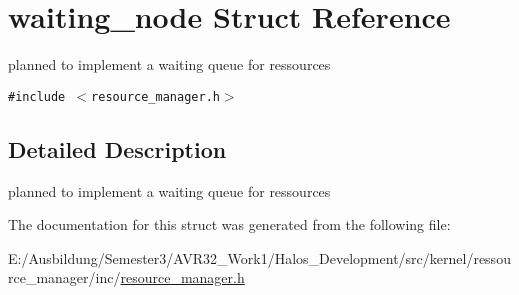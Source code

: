 \hypertarget{structwaiting__node}{
\section{waiting\_\-node Struct Reference}
\label{structwaiting__node}
}
planned to implement a waiting queue for ressources  


{\tt \#include $<$resource\_\-manager.h$>$}



\subsection{Detailed Description}
planned to implement a waiting queue for ressources 

The documentation for this struct was generated from the following file:\begin{CompactItemize}
\item 
E:/Ausbildung/Semester3/AVR32\_\-Work1/Halos\_\-Development/src/kernel/ressource\_\-manager/inc/\hyperlink{resource__manager_8h}{resource\_\-manager.h}\end{CompactItemize}
